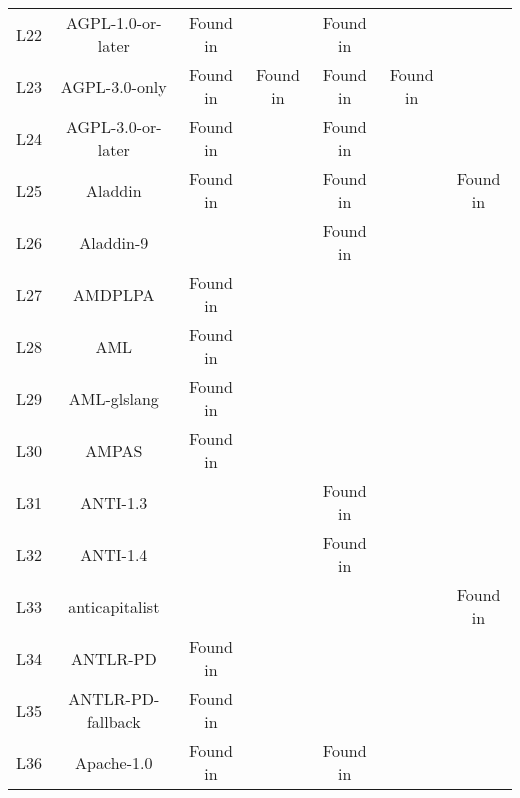 \begin{table}[]
\begin{tabular}{c|c|c|c|c|c|c}
  L22                            & AGPL-1.0-or-later                              & Found in      &               & Found in     &              &              \\
  L23                            & AGPL-3.0-only                                  & Found in      & Found in      & Found in     & Found in     &              \\
  L24                            & AGPL-3.0-or-later                              & Found in      &               & Found in     &              &              \\
  L25                            & Aladdin                                        & Found in      &               & Found in     &              & Found in     \\
  L26                            & Aladdin-9                                      &               &               & Found in     &              &              \\
  L27                            & AMDPLPA                                        & Found in      &               &              &              &              \\
  L28                            & AML                                            & Found in      &               &              &              &              \\
  L29                            & AML-glslang                                    & Found in      &               &              &              &              \\
  L30                            & AMPAS                                          & Found in      &               &              &              &              \\
  L31                            & ANTI-1.3                                       &               &               & Found in     &              &              \\
  L32                            & ANTI-1.4                                       &               &               & Found in     &              &              \\
  L33                            & anticapitalist                                 &               &               &              &              & Found in     \\
  L34                            & ANTLR-PD                                       & Found in      &               &              &              &              \\
  L35                            & ANTLR-PD-fallback                              & Found in      &               &              &              &              \\
  L36                            & Apache-1.0                                     & Found in      &               & Found in     &              &              \\
  \end{tabular}
  \end{table}